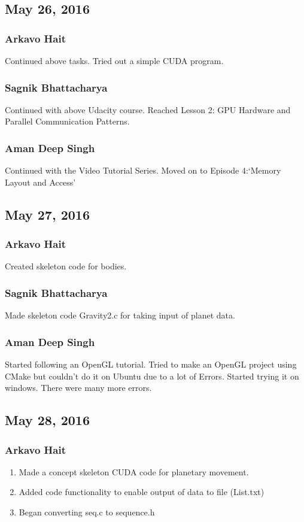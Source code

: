 \documentclass{article}
\begin{document}
\subsection*{May 26, 2016}
\subsubsection*{Arkavo Hait}
Continued above tasks. Tried out a simple CUDA program.
\subsubsection*{Sagnik Bhattacharya}
Continued with above Udacity course. Reached Lesson 2: GPU Hardware and Parallel Communication Patterns.
\subsubsection*{Aman Deep Singh}
Continued with the Video Tutorial Series. Moved on to Episode 4:`Memory Layout and Access'
\subsection*{May 27, 2016}
\subsubsection*{Arkavo Hait}
Created skeleton code for bodies.
\subsubsection*{Sagnik Bhattacharya}
Made skeleton code Gravity2.c for taking input of planet data.
\subsubsection*{Aman Deep Singh}
Started following an OpenGL tutorial. Tried to make an OpenGL project using CMake but couldn't do it on Ubuntu due to a lot of Errors. Started trying it on windows. There were many more errors.
\subsection*{May 28, 2016}
\subsubsection*{Arkavo Hait}
\begin{enumerate}
	\item Made a concept skeleton CUDA code for planetary movement.
	\item Added code functionality to enable output of data to file (List.txt)
	\item Began converting seq.c to sequence.h
\end{enumerate}
\end{document}
